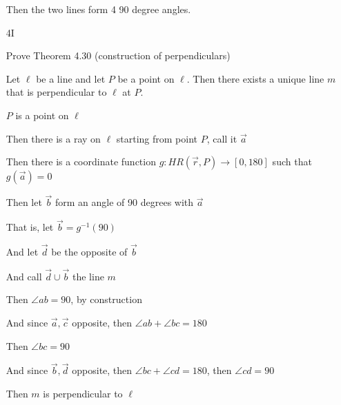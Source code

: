\documentclass[11pt]{article}
\newcommand{\ray}[1]{\overrightarrow{#1}}
\begin{document}
\begin{itemize}
		Then the two lines form 4 90 degree angles.

	\item[4I]

		Prove Theorem 4.30 (construction of perpendiculars)

		Let $\ell$ be a line and let $P$ be a point on $\ell$. Then there exists a unique line $m$ that is perpendicular to $\ell$ at $P$.

		$P$ is a point on $\ell$

		Then there is a ray on $\ell$ starting from point $P$, call it $\ray{a}$

		Then there is a coordinate function $g:HR(\ray{r}, P) \rightarrow [0,180]$ such that $g(\ray{a}) = 0$

		Then let $\ray{b}$ form an angle of 90 degrees with $\ray{a}$

		That is, let $\ray{b} = g^{-1} (90)$

		And let $\ray{d}$ be the opposite of $\ray{b}$

		And call $\ray{d} \cup \ray{b}$ the line $m$

		Then $\angle{ab} = 90$, by construction

		And since $\ray{a},\ray{c}$ opposite, then $\angle{ab} + \angle{bc} = 180$

		Then $\angle{bc} = 90$

		And since $\ray{b},\ray{d}$ opposite, then $\angle{bc} + \angle{cd} = 180$, then $\angle{cd} = 90$

		Then $m$ is perpendicular to $\ell$

\end{itemize}
\end{document}
